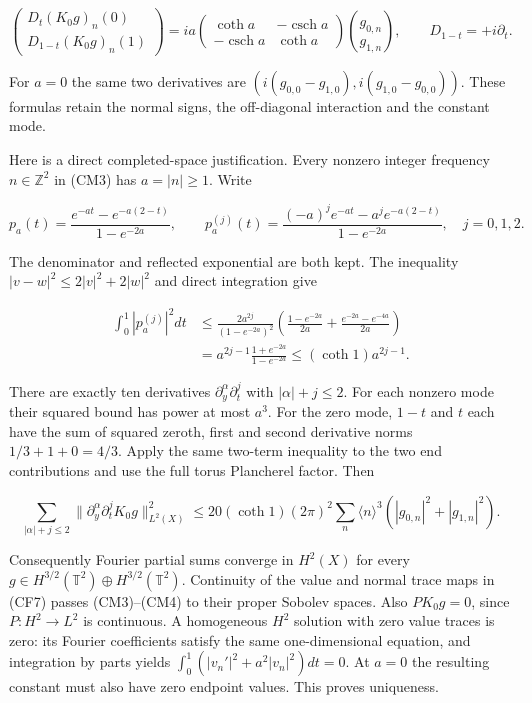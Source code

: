 \documentclass[
  11pt,
]{article}
\begin{document}
\[
 \begin{pmatrix}D_t(K_0g)_n(0)\\D_{1-t}(K_0g)_n(1)\end{pmatrix}
 =i a\begin{pmatrix}\coth a&-\operatorname{csch}a\\
                 -\operatorname{csch}a&\coth a\end{pmatrix}
                  \binom{g_{0,n}}{g_{1,n}},
 \qquad D_{1-t}=+i\partial_t.
 \tag{CM4}
\]

For \(a=0\) the same two derivatives are
\((i(g_{0,0}-g_{1,0}),i(g_{1,0}-g_{0,0}))\). These formulas retain the
normal signs, the off-diagonal interaction and the constant mode.

Here is a direct completed-space justification. Every nonzero integer
frequency \(n\in\mathbb Z^2\) in (CM3) has \(a=|n|\geq1\). Write

\[
 p_a(t)=\frac{e^{-at}-e^{-a(2-t)}}{1-e^{-2a}},\qquad
 p_a^{(j)}(t)=
 \frac{(-a)^j e^{-at}-a^j e^{-a(2-t)}}{1-e^{-2a}},\quad j=0,1,2.
 \tag{CM5}
\]

The denominator and reflected exponential are both kept. The inequality
\(|v-w|^2\leq2|v|^2+2|w|^2\) and direct integration give

\[
 \begin{aligned}
 \int_0^1|p_a^{(j)}|^2dt
 &\leq\frac{2a^{2j}}{(1-e^{-2a})^2}
       \left(\frac{1-e^{-2a}}{2a}
                     +\frac{e^{-2a}-e^{-4a}}{2a}\right)\\
 &=a^{2j-1}\frac{1+e^{-2a}}{1-e^{-2a}}
       \leq (\coth1)a^{2j-1}.
 \end{aligned}
 \tag{CM6}
\]

There are exactly ten derivatives \(\partial_y^\alpha\partial_t^j\) with
\(|\alpha|+j\leq2\). For each nonzero mode their squared bound has power
at most \(a^3\). For the zero mode, \(1-t\) and \(t\) each have the sum
of squared zeroth, first and second derivative norms \(1/3+1+0=4/3\).
Apply the same two-term inequality to the two end contributions and use
the full torus Plancherel factor. Then

\[
 \sum_{|\alpha|+j\leq2}
      \|\partial_y^\alpha\partial_t^jK_0g\|_{L^2(X)}^2
 \leq20(\coth1)(2\pi)^2\sum_n\langle n\rangle^3
                          (|g_{0,n}|^2+|g_{1,n}|^2).
 \tag{CM7}
\]

Consequently Fourier partial sums converge in \(H^2(X)\) for every
\(g\in H^{3/2}(\mathbb T^2)\oplus H^{3/2}(\mathbb T^2)\). Continuity of
the value and normal trace maps in (CF7) passes (CM3)--(CM4) to their
proper Sobolev spaces. Also \(PK_0g=0\), since \(P:H^2\to L^2\) is
continuous. A homogeneous \(H^2\) solution with zero value traces is
zero: its Fourier coefficients satisfy the same one-dimensional
equation, and integration by parts yields
\(\int_0^1(|v_n'|^2+a^2|v_n|^2)dt=0\). At \(a=0\) the resulting constant
must also have zero endpoint values. This proves uniqueness.
\end{document}
